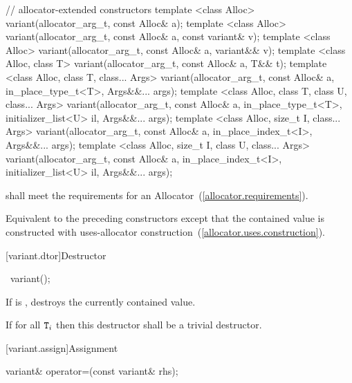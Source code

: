 %
\begin{itemdecl}
// allocator-extended constructors
template <class Alloc>
  variant(allocator_arg_t, const Alloc& a);
template <class Alloc>
  variant(allocator_arg_t, const Alloc& a, const variant& v);
template <class Alloc>
  variant(allocator_arg_t, const Alloc& a, variant&& v);
template <class Alloc, class T>
  variant(allocator_arg_t, const Alloc& a, T&& t);
template <class Alloc, class T, class... Args>
  variant(allocator_arg_t, const Alloc& a, in_place_type_t<T>, Args&&... args);
template <class Alloc, class T, class U, class... Args>
  variant(allocator_arg_t, const Alloc& a, in_place_type_t<T>,
          initializer_list<U> il, Args&&... args);
template <class Alloc, size_t I, class... Args>
  variant(allocator_arg_t, const Alloc& a, in_place_index_t<I>, Args&&... args);
template <class Alloc, size_t I, class U, class... Args>
  variant(allocator_arg_t, const Alloc& a, in_place_index_t<I>,
          initializer_list<U> il, Args&&... args);
\end{itemdecl}

\begin{itemdescr}
\pnum
\requires
{} shall meet the requirements for an Allocator~(\ref{allocator.requirements}).

\pnum
\effects
Equivalent to the preceding constructors except that the contained value is
constructed with uses-allocator construction~(\ref{allocator.uses.construction}).
\end{itemdescr}

[variant.dtor]{Destructor}

%
\begin{itemdecl}
~variant();
\end{itemdecl}

\begin{itemdescr}
\pnum
\effects
If  is ,
destroys the currently contained value.

\pnum
\remarks
If  for all $\texttt{T}_i$
then this destructor shall be a trivial destructor.
\end{itemdescr}

[variant.assign]{Assignment}

%
\begin{itemdecl}
variant& operator=(const variant& rhs);
\end{itemdecl}


